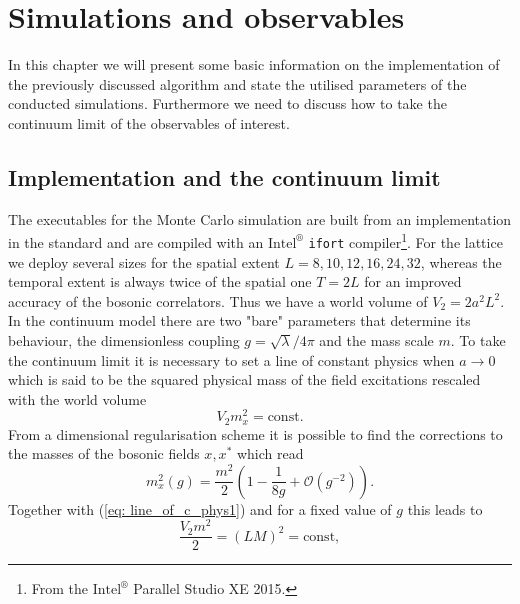 \chapter{Simulations and observables}\label{ch: parameters}
In this chapter we will present some basic information on the implementation of the previously discussed algorithm and state the utilised parameters of the conducted simulations. Furthermore we need to discuss how to take the continuum limit of the observables of interest.
%
%
%
%
%
%
\section{Implementation and the continuum limit}
The executables for the Monte Carlo simulation are built from an implementation in the  standard and are compiled with an $\text{Intel}^{\circledR}$ \texttt{ifort} compiler\footnote{From the $\text{Intel}^{\circledR}$ Parallel Studio XE 2015.}. For the lattice we deploy several sizes for the spatial extent $L=8,10,12,16,24,32$, whereas the temporal extent is always twice of the spatial one $T=2L$ for an improved accuracy of the bosonic correlators. Thus we have a world volume of $V_{2}=2a^{2}L^{2}$. In the continuum model there are two "bare" parameters that determine its behaviour, the dimensionless coupling $g=\sqrt{\lambda}/4\pi$ and the mass scale $m$. To take the continuum limit it is necessary to set a line of constant physics when $a \to 0$ which is said to be the squared physical mass of the field excitations rescaled with the world volume
%
%
\begin{equation}
V_{2}m_{x}^{2} = \text{const}.
\label{eq: line_of_c_phys1}
\end{equation}
%
%
From a dimensional regularisation scheme it is possible to find the corrections to the masses of the bosonic fields $x,x^{*}$ which read \cite{Giombi:2010bj}
%
%
\begin{equation}
m_{x}^{2}(g) = \frac{m^{2}}{2}\left(1 - \frac{1}{8g} + \mathcal{O}(g^{-2}) \right).
\label{eq: m_x}
\end{equation}
%
%
Together with (\ref{eq: line_of_c_phys1}) and for a fixed value of $g$ this leads to 
%
%
\begin{equation}
\frac{V_{2}m^{2}}{2} = (LM)^{2} = \text{const},
\label{eq: line_of_c_phys2}
\end{equation}
%
%
